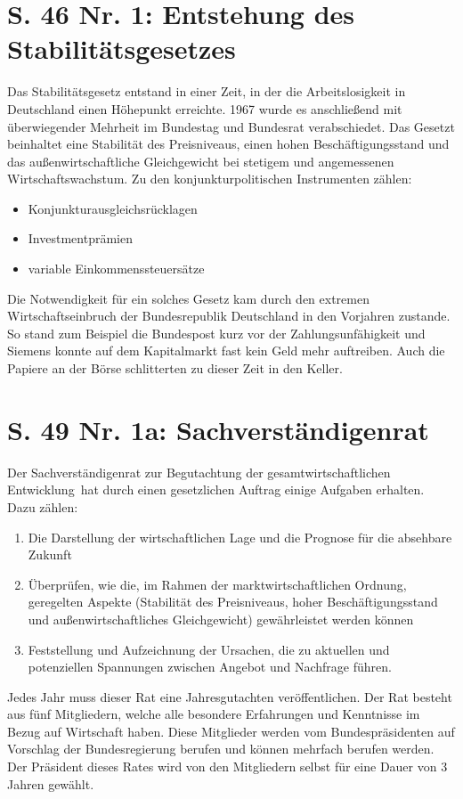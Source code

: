 \documentclass[a4paper, 12pt]{report}
\begin{document}
	\bsremovechaptertitle
	\chapter{S. 46 Nr. 1: Entstehung des Stabilitätsgesetzes}
	Das Stabilitätsgesetz entstand in einer Zeit, in der die Arbeitslosigkeit in Deutschland einen Höhepunkt erreichte.
	1967 wurde es anschließend mit überwiegender Mehrheit im Bundestag und Bundesrat verabschiedet.
	Das Gesetzt beinhaltet eine Stabilität des Preisniveaus, einen hohen Beschäftigungsstand und das außenwirtschaftliche Gleichgewicht bei stetigem und angemessenen Wirtschaftswachstum.
	Zu den konjunkturpolitischen Instrumenten zählen:
	\begin{itemize}
		\item Konjunkturausgleichsrücklagen
		\item Investmentprämien
		\item variable Einkommenssteuersätze
	\end{itemize}
	Die Notwendigkeit für ein solches Gesetz kam durch den extremen Wirtschaftseinbruch der Bundesrepublik Deutschland in den Vorjahren zustande.
	So stand zum Beispiel die Bundespost kurz vor der Zahlungsunfähigkeit und Siemens konnte auf dem Kapitalmarkt fast kein Geld mehr auftreiben.
	Auch die Papiere an der Börse schlitterten zu dieser Zeit in den Keller.
	\chapter{S. 49 Nr. 1a: Sachverständigenrat}
	Der \dq Sachverständigenrat zur Begutachtung der gesamtwirtschaftlichen Entwicklung\dq\ hat durch einen gesetzlichen Auftrag einige Aufgaben erhalten.
	Dazu zählen:
	\begin{enumerate}
		\item Die Darstellung der wirtschaftlichen Lage und die Prognose für die absehbare Zukunft
		\item Überprüfen, wie die, im Rahmen der marktwirtschaftlichen Ordnung, geregelten Aspekte (Stabilität des Preisniveaus, hoher Beschäftigungsstand und außenwirtschaftliches Gleichgewicht) gewährleistet werden können
		\item Feststellung und Aufzeichnung der Ursachen, die zu aktuellen und potenziellen Spannungen zwischen Angebot und Nachfrage führen.
	\end{enumerate}
	Jedes Jahr muss dieser Rat eine Jahresgutachten veröffentlichen.
	Der Rat besteht aus fünf Mitgliedern, welche alle besondere Erfahrungen und Kenntnisse im Bezug auf Wirtschaft haben.
	Diese Mitglieder werden vom Bundespräsidenten auf Vorschlag der Bundesregierung berufen und können mehrfach berufen werden.
	Der Präsident dieses Rates wird von den Mitgliedern selbst für eine Dauer von 3 Jahren gewählt.
\end{document}
